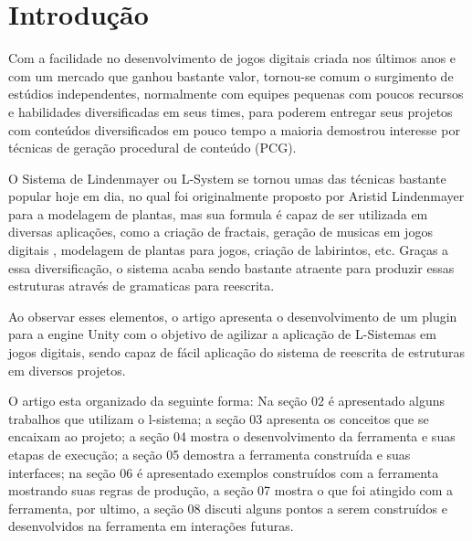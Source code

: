 \section{Introdução}
Com a facilidade no desenvolvimento de jogos digitais criada nos últimos anos e com um mercado que ganhou bastante valor, tornou-se comum o surgimento de estúdios independentes, normalmente com equipes pequenas com poucos recursos e habilidades diversificadas em seus times, para poderem entregar seus projetos com conteúdos diversificados em pouco tempo a maioria demostrou interesse por técnicas de geração procedural de conteúdo (PCG).

O Sistema de Lindenmayer ou L-System\cite{Prusinkiewicz} se tornou umas das técnicas bastante popular hoje em dia, no qual foi originalmente proposto por Aristid Lindenmayer para a modelagem de plantas, mas sua formula é capaz de ser utilizada em diversas aplicações, como a criação de fractais, geração de musicas em jogos digitais \cite{Fridenfalk} , modelagem de plantas para jogos, criação de labirintos, etc. Graças a essa diversificação, o sistema acaba sendo bastante atraente para produzir essas estruturas através de gramaticas para reescrita.


Ao observar esses elementos, o artigo apresenta o desenvolvimento de um plugin para a engine Unity com o objetivo de agilizar a aplicação de L-Sistemas em jogos digitais, sendo capaz de fácil aplicação do sistema de reescrita de estruturas em diversos projetos.

O artigo esta organizado da seguinte forma: Na seção 02 é apresentado alguns trabalhos que utilizam o l-sistema; a seção 03 apresenta os conceitos que se encaixam ao projeto; a seção 04 mostra o desenvolvimento da ferramenta e suas etapas de execução; a seção 05 demostra a ferramenta construída e suas interfaces; na seção 06 é apresentado exemplos construídos com a ferramenta mostrando suas regras de produção, a seção 07 mostra o que foi atingido com a ferramenta, por ultimo, a seção 08 discuti alguns pontos a serem construídos e desenvolvidos na ferramenta em interações futuras.